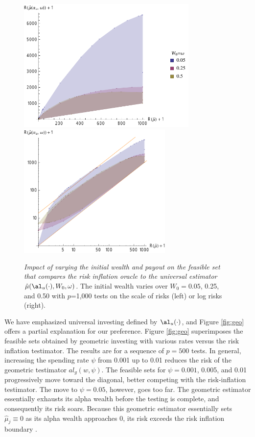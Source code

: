 \documentclass[12pt]{article}
\newcommand{\uTest}{\mbox{$\hat\mu(\al_u(\cdot),W_0,\omega)$}}
\begin{document}
\begin{figure}
 \caption{ \label{fig:univRI} {\sl Impact of varying the initial wealth and payout on the  feasible set that compares the risk inflation oracle to the universal estimator
 \uTest.} The initial wealth varies over $W_0=0.05$,
 0.25, and 0.50 with $p$=1,000 tests on the scale of risks (left) or log risks
 (right).  }

 \vspace{0.1in}
 \centerline{
 \includegraphics[width=3.5in]{figures/univVsRI}
 \includegraphics[width=3.0in]{figures/univVsRILog}    }
 \vspace{0.2in}
\end{figure}


 We have emphasized universal investing defined by $\al_u(\cdot)$, and Figure
 \ref{fig:geo} offers a partial explanation for our preference.  Figure
 \ref{fig:geo} superimposes the feasible sets obtained by geometric investing with various rates versus the risk inflation testimator.  The results are for a sequence of $p = 500$ tests.  In general, increasing the spending rate $\psi$ from 0.001 up to 0.01 reduces the risk of the geometric testimator $al_g(w,\psi)$. The feasible sets for $\psi=0.001$, 0.005, and 0.01 progressively move toward
 the diagonal, better competing with the risk-inflation testimator.  The move to
 $\psi = 0.05$, however, goes too far.  The geometric estimator essentially exhausts its
 alpha wealth before the testing is complete, and consequently its risk soars.
  Because this geometric estimator essentially sets $\hat\mu_j \equiv 0$ as its
 alpha wealth approaches 0, its risk exceeds the risk inflation boundary
 .
\end{document}

